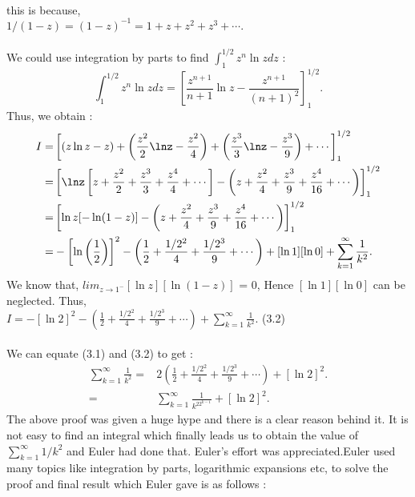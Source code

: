 \documentclass[a4paper,reqno,11pt]{amsart}
\theoremstyle{plain}%
\begin{document}
\\
this is because,\\$1/(1-z) = (1-z)^{-1} = 1 + z + z^2 + z^3 + \cdots.$\\
\\
We could use integration by parts to find $\int_{1}^{1/2}z^n\ln zdz$ :\\
$$\int_{1}^{1/2}z^n\ln zdz = \left[\frac{z^{n+1}}{n+1}\ln z - \frac{z^{n+1}}{(n+1)^2}\right]_1^{1/2}.$$
Thus, we obtain :
\begin{align*}
I =&  \left[(z\ln z - z) + \left(\frac{z^2}{2}\lnz - \frac{z^2}{4}\right) + \left(\frac{z^3}{3}\lnz - \frac{z^3}{9}\right) + \cdots\right]_1^{1/2}\\
=& \left[\lnz\left[z + \frac{z^2}{2} + \frac{z^3}{3} + \frac{z^4}{4} + \cdots\right] - \left(z + \frac{z^2}{4} + \frac{z^3}{9} + \frac{z^4}{16} + \cdots\right)\right]_1^{1/2}\\
=& \left[\ln z[-\ln(1-z)] - \left(z + \frac{z^2}{4} + \frac{z^3}{9} + \frac{z^4}{16} + \cdots\right)\right]_1^{1/2}\\
=& -\left[\ln\left(\frac{1}{2}\right)\right]^2 - \left(\frac{1}{2} + \frac{1/2^2}{4} + \frac{1/2^3}{9} + \cdots\right) + [\ln1][\ln0] + \sum_{k=1}^{\infty}\frac{1}{k^2}.
\end{align*}
We know that, $lim_{z\to1^-}[\ln z][\ln(1-z)]$ = 0, Hence $[\ln1][\ln0]$ can be neglected. Thus,\\
$I = -[\ln2]^2 - \left(\frac{1}{2} + \frac{1/2^2}{4} + \frac{1/2^3}{9} + \cdots\right) + \sum_{k=1}^{\infty}\frac{1}{k^2}.$ \hspace{3cm} (3.2)\\
\\
We can equate (3.1) and (3.2) to get :\\
\begin{align*}
\sum_{k=1}^{\infty}\frac{1}{k^2} =& 2\left(\frac{1}{2} + \frac{1/2^2}{4} + \frac{1/2^3}{9} + \cdots\right) + [\ln2]^2. \\
=& \sum_{k=1}^{\infty}\frac{1}{k^22^{k-1}}  + [\ln2]^2.
\end{align*}
The above proof was given a huge hype and there is a clear reason behind it. It is not easy to find an integral which finally leads us to obtain the value of $\sum_{k=1}^{\infty}1/k^2$ and Euler had done that. Euler's effort was appreciated.Euler used many topics like integration by parts, logarithmic expansions etc, to solve the proof and final result which Euler gave is as follows :
\end{document}
